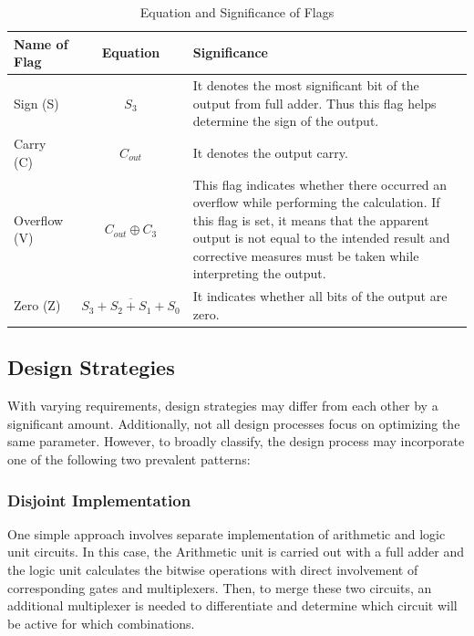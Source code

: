 \documentclass{article}
\begin{document}
\begin{center}
\begin{table}[h]
    \centering
\begin{tabular}{|l|c|p{10cm}|}

\hline
\textbf{Name of Flag} & \textbf{Equation} & \textbf{Significance}        \\ \hline

Sign (S)     & $S_3$       & It denotes the most significant bit of the output from full adder. Thus this flag helps determine  the sign of the output.                                                           \\ \hline
Carry (C)    & $C_{out}$   & It denotes the output carry.                                                                                                                                                         \\ \hline
Overflow (V) & $C_{out} \oplus C_{3}$ & This flag indicates whether there occurred an overflow while performing the calculation. If this flag is set, it means that the apparent output is not equal to the intended result and corrective measures must be taken while interpreting the output. \\ \hline
Zero (Z)     & $\overline{S_{3}+S_{2}+S_{1}+S_{0}}$         & It indicates whether all bits of the output are zero. \\ \hline

\end{tabular}
\caption{Equation and Significance of Flags}
\end{table}
\end{center}

\newpage
\subsection{Design Strategies}

With varying requirements, design strategies may differ from each other by a significant amount. Additionally, not all design processes focus on optimizing the same parameter. However, to broadly classify, the design process may incorporate one of the following two prevalent patterns:

\subsubsection{Disjoint Implementation}

One simple approach involves separate implementation of arithmetic and logic unit circuits. In this case, the Arithmetic unit is carried out with a full adder and the logic unit calculates the bitwise operations with direct involvement of corresponding gates and multiplexers. Then, to merge these two circuits, an additional multiplexer is needed to differentiate and determine which circuit will be active for which combinations.
\end{document}
